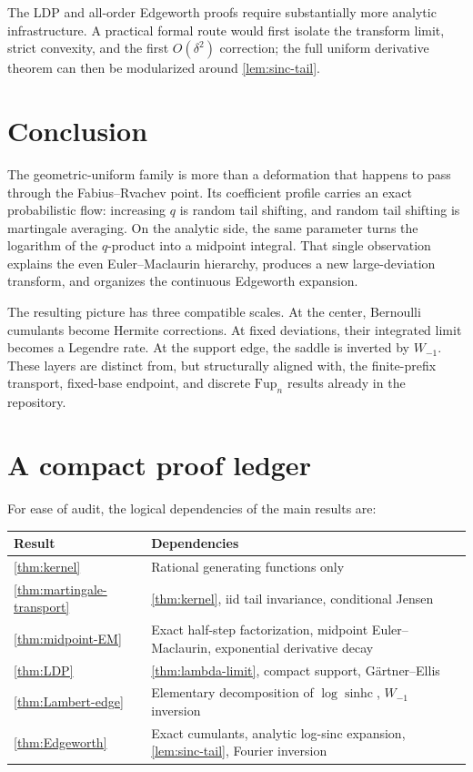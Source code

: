 \documentclass[11pt,a4paper]{article}
\theoremstyle{definition}
\newcommand{\sinhc}{\operatorname{sinhc}}
\newcommand{\1}{\mathbf{1}}
\begin{document}
The LDP and all-order Edgeworth proofs require substantially more analytic
infrastructure.  A practical formal route would first isolate the transform
limit, strict convexity, and the first $O(\delta^2)$ correction; the full
uniform derivative theorem can then be modularized around
\cref{lem:sinc-tail}.

\section{Conclusion}

The geometric-uniform family is more than a deformation that happens to pass
through the Fabius--Rvachev point.  Its coefficient profile carries an exact
probabilistic flow: increasing $q$ is random tail shifting, and random tail
shifting is martingale averaging.  On the analytic side, the same parameter
turns the logarithm of the $q$-product into a midpoint integral.  That single
observation explains the even Euler--Maclaurin hierarchy, produces a new
large-deviation transform, and organizes the continuous Edgeworth expansion.

The resulting picture has three compatible scales.  At the center, Bernoulli
cumulants become Hermite corrections.  At fixed deviations, their integrated
limit becomes a Legendre rate.  At the support edge, the saddle is inverted by
$W_{-1}$.  These layers are distinct from, but structurally aligned with, the
finite-prefix transport, fixed-base endpoint, and discrete $\mathrm{Fup}_n$
results already in the repository.

\appendix

\section{A compact proof ledger}
\label{app:ledger}

For ease of audit, the logical dependencies of the main results are:

\begin{center}
\begin{tabularx}{0.96\textwidth}{@{}lX@{}}
\toprule
Result & Dependencies \\
\midrule
\cref{thm:kernel} & Rational generating functions only \\
\cref{thm:martingale-transport} & \cref{thm:kernel}, iid tail invariance,
conditional Jensen \\
\cref{thm:midpoint-EM} & Exact half-step factorization, midpoint
Euler--Maclaurin, exponential derivative decay \\
\cref{thm:LDP} & \cref{thm:lambda-limit}, compact support,
G\"artner--Ellis \\
\cref{thm:Lambert-edge} & Elementary decomposition of $\log\sinhc$,
$W_{-1}$ inversion \\
\cref{thm:Edgeworth} & Exact cumulants, analytic log-sinc expansion,
\cref{lem:sinc-tail}, Fourier inversion \\
\bottomrule
\end{tabularx}
\end{center}
\end{document}
